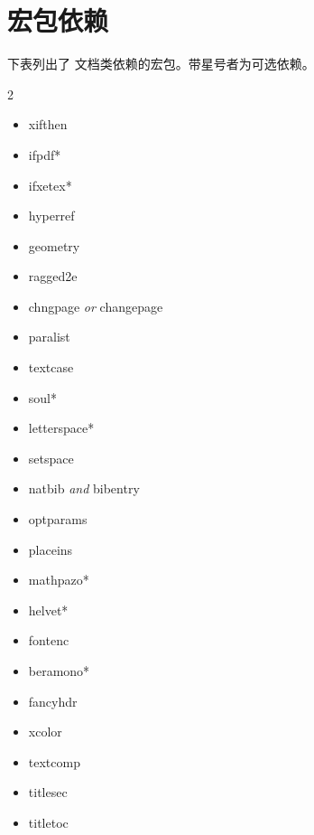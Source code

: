 \section{宏包依赖}\label{sec:dependencies}
下表列出了 \TL 文档类依赖的宏包。带星号者为可选依赖。
\begin{multicols}{2}
\begin{itemize}
  \item xifthen
  \item ifpdf*
  \item ifxetex*
  \item hyperref
  \item geometry
  \item ragged2e
  \item chngpage \emph{or} changepage
  \item paralist
  \item textcase
  \item soul*
  \item letterspace*
  \item setspace
  \item natbib \emph{and} bibentry
  \item optparams
  \item placeins
  \item mathpazo*
  \item helvet*
  \item fontenc
  \item beramono*
  \item fancyhdr
  \item xcolor
  \item textcomp
  \item titlesec
  \item titletoc
\end{itemize}
\end{multicols}




